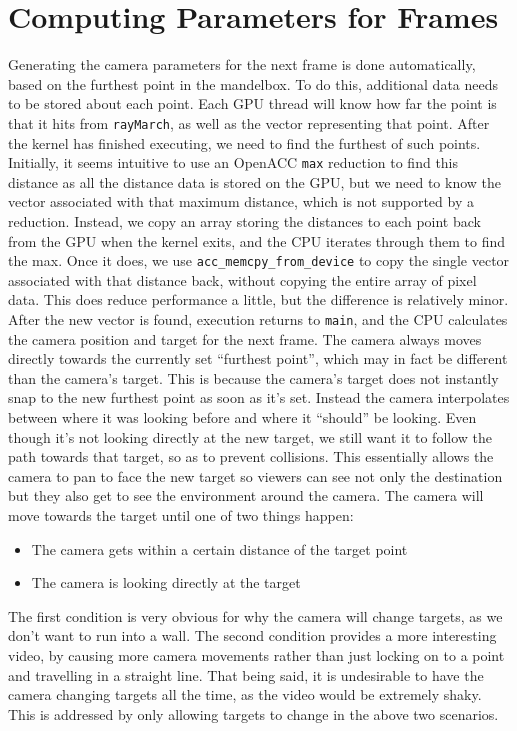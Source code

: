 \documentclass[11pt]{article}
\begin{document}
\section{Computing Parameters for Frames}\label{Sec_AutomaticNav}
Generating the camera parameters for the next frame is done automatically, based on the furthest point in the mandelbox. To do this, additional data needs to be stored about each point. Each GPU thread will know how far the point is that it hits from \texttt{rayMarch}, as well as the vector representing that point. After the kernel has finished executing, we need to find the furthest of such points. Initially, it seems intuitive to use an OpenACC \texttt{max} reduction to find this distance as all the distance data is stored on the GPU, but we need to know the vector associated with that maximum distance, which is not supported by a reduction. Instead, we copy an array storing the distances to each point back from the GPU when the kernel exits, and the CPU iterates through them to find the max. Once it does, we use \texttt{acc\_memcpy\_from\_device} to copy the single vector associated with that distance back, without copying the entire array of pixel data. This does reduce performance a little, but the difference is relatively minor.\\

After the new vector is found, execution returns to \texttt{main}, and the CPU calculates the camera position and target for the next frame. The camera always moves directly towards the currently set ``furthest point'', which may in fact be different than the camera's target. This is because the camera's target does not instantly snap to the new furthest point as soon as it's set. Instead the camera interpolates between where it was looking before and where it ``should'' be looking. Even though it's not looking directly at the new target, we still want it to follow the path towards that target, so as to prevent collisions. This essentially allows the camera to pan to face the new target so viewers can see not only the destination but they also get to see the environment around the camera. The camera will move towards the target until one of two things happen:
\begin{itemize}
\item The camera gets within a certain distance of the target point
\item The camera is looking directly at the target
\end{itemize}
The first condition is very obvious for why the camera will change targets, as we don't want to run into a wall. The second condition provides a more interesting video, by causing more camera movements rather than just locking on to a point and travelling in a straight line. That being said, it is undesirable to have the camera changing targets all the time, as the video would be extremely shaky. This is addressed by only allowing targets to change in the above two scenarios.
\end{document}
